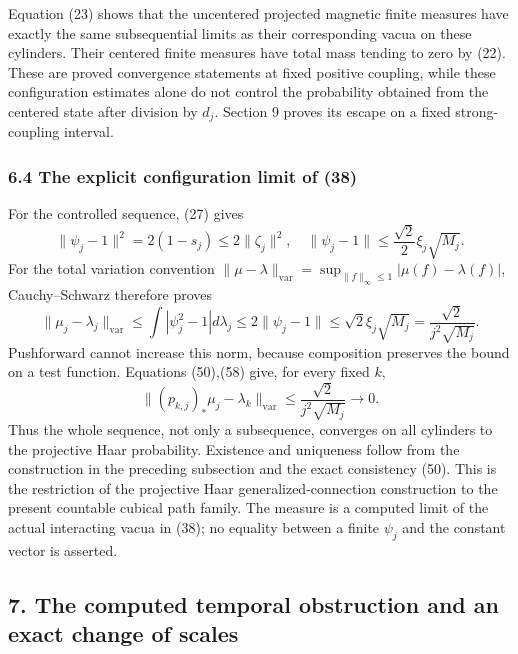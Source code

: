 \documentclass[
  11pt,
]{article}
\begin{document}
Equation (23) shows that the uncentered projected magnetic finite
measures have exactly the same subsequential limits as their
corresponding vacua on these cylinders. Their centered finite measures
have total mass tending to zero by (22). These are proved convergence
statements at fixed positive coupling, while these configuration
estimates alone do not control the probability obtained from the
centered state after division by \(d_j\). Section 9 proves its escape on
a fixed strong-coupling interval.

\subsubsection{6.4 The explicit configuration limit of
(38)}\label{the-explicit-configuration-limit-of-38}

For the controlled sequence, (27) gives \[
 \|\psi_j-1\|^2=2(1-s_j)\le2\|\zeta_j\|^2,
 \quad\|\psi_j-1\|\le\frac{\sqrt2}{2}\xi_j\sqrt{M_j}.
\] For the total variation convention
\(\|\mu-\lambda\|_{\mathrm{var}}=\sup_{\|f\|_\infty\le1}|\mu(f)-\lambda(f)|\),
Cauchy--Schwarz therefore proves \[
 \|\mu_j-\lambda_j\|_{\mathrm{var}}
 \le\int|\psi_j^2-1|d\lambda_j
 \le2\|\psi_j-1\|
 \le\sqrt2\xi_j\sqrt{M_j}=\frac{\sqrt2}{j^2\sqrt{M_j}}.
\tag{58}
\] Pushforward cannot increase this norm, because composition preserves
the bound on a test function. Equations (50),(58) give, for every fixed
\(k\), \[
 \|(p_{k,j})_*\mu_j-\lambda_k\|_{\mathrm{var}}
 \le\frac{\sqrt2}{j^2\sqrt{M_j}}\longrightarrow0.
\tag{59}
\] Thus the whole sequence, not only a subsequence, converges on all
cylinders to the projective Haar probability. Existence and uniqueness
follow from the construction in the preceding subsection and the exact
consistency (50). This is the restriction of the projective Haar
generalized-connection construction to the present countable cubical
path family. The measure is a computed limit of the actual interacting
vacua in (38); no equality between a finite \(\psi_j\) and the constant
vector is asserted.

\subsection{7. The computed temporal obstruction and an exact change of
scales}\label{the-computed-temporal-obstruction-and-an-exact-change-of-scales}
\end{document}
